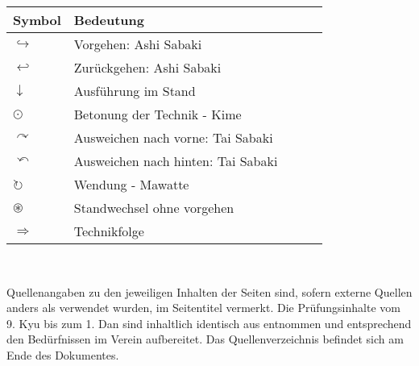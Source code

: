 	\begin{tabularx}{\textwidth}{lllll}
		Symbol	& Bedeutung	& &&\\
		\midrule
		\(\hookrightarrow\) 	& Vorgehen: Ashi Sabaki					& & &\\
		\(\hookleftarrow\) 		& Zurückgehen: Ashi Sabaki				& & &\\
		\(\downarrow\) 			& Ausführung im Stand					& & &\\
		\(\odot\) 				& Betonung der Technik - Kime			& & &\\
		\(\curvearrowright\)	& Ausweichen nach vorne: Tai Sabaki		& & &\\
		\(\curvearrowleft\)		& Ausweichen nach hinten: Tai Sabaki	& & &\\
		\(\circlearrowright\)	& Wendung - Mawatte						& & &\\
		\(\circledast\)			& Standwechsel ohne vorgehen			& & &\\
		\(\Rightarrow\)			& Technikfolge							& & &\\
	\end{tabularx}\\\null\vfill\null
	\begin{center}
	\parbox{\textwidth-2\tabcolsep}{Quellenangaben zu den jeweiligen Inhalten der Seiten sind, sofern externe Quellen anders als \cite{Internet} verwendet wurden, im Seitentitel vermerkt. Die Prüfungsinhalte vom 9. Kyu bis zum 1. Dan sind inhaltlich identisch aus \cite{GKD2023} entnommen und entsprechend den Bedürfnissen im Verein aufbereitet. Das Quellenverzeichnis befindet sich am Ende des Dokumentes.}
	\end{center}\null\vfill\null